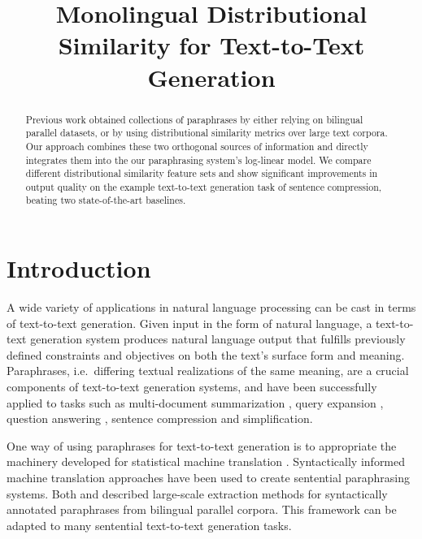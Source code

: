 \documentclass[11pt]{article}
\author{}
\title{Monolingual Distributional Similarity for Text-to-Text Generation}
\begin{document}
\maketitle

\begin{abstract}
  Previous work obtained collections of paraphrases by either relying
  on bilingual parallel datasets, or by using distributional
  similarity metrics over large text corpora. Our approach combines
  these two orthogonal sources of information and directly integrates
  them into the our paraphrasing system's log-linear model. We compare
  different distributional similarity feature sets and show
  significant improvements in output quality on the example
  text-to-text generation task of sentence compression, beating two
  state-of-the-art baselines.
\end{abstract}

\section{Introduction}

A wide variety of applications in natural language processing can be
cast in terms of text-to-text generation. Given input in the form of
natural language, a text-to-text generation system produces natural
language output that fulfills previously defined constraints and
objectives on both the text's surface form and meaning. Paraphrases,
i.e.\ differing textual realizations of the same meaning, are a
crucial components of text-to-text generation systems, and have been
successfully applied to tasks such as multi-document summarization
\cite{Barzilay1999,BarzilayThesis}, query expansion
\cite{Anick1999,Riezler2007}, question answering
\cite{mckeown:1979:ACL,Ravichandran2002}, sentence compression and
simplification.

One way of using paraphrases for text-to-text generation is to
appropriate the machinery developed for statistical machine
translation \cite{Quirk2004}. Syntactically informed machine
translation approaches have been used to create sentential
paraphrasing systems. Both  and
 described large-scale extraction methods
for syntactically annotated paraphrases from bilingual parallel
corpora. This framework can be adapted to many sentential text-to-text
generation tasks.
\end{document}
